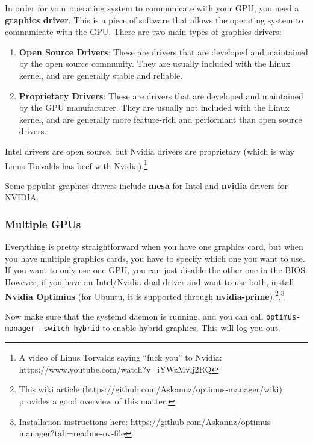   \begin{definition}
    \label{def:graphics-driver}
    In order for your operating system to communicate with your GPU, you need a \textbf{graphics driver}. This is a piece of software that allows the operating system to communicate with the GPU. There are two main types of graphics drivers:
    \begin{enumerate} 
      \item \textbf{Open Source Drivers}: These are drivers that are developed and maintained by the open source community. They are usually included with the Linux kernel, and are generally stable and reliable. 
      \item \textbf{Proprietary Drivers}: These are drivers that are developed and maintained by the GPU manufacturer. They are usually not included with the Linux kernel, and are generally more feature-rich and performant than open source drivers. 
    \end{enumerate}
  Intel drivers are open source, but Nvidia drivers are proprietary (which is why Linus Torvalds has beef with Nvidia).\footnote{A video of Linus Torvalds saying ``fuck you'' to Nvidia: https://www.youtube.com/watch?v=iYWzMvlj2RQ}
  \end{definition}

  Some popular \hyperref[def:graphics-driver]{graphics drivers} include \textbf{mesa} for Intel and \textbf{nvidia} drivers for NVIDIA. 

  \subsubsection{Multiple GPUs} 

    Everything is pretty straightforward when you have one graphics card, but when you have multiple graphics cards, you have to specify which one you want to use. If you want to only use one GPU, you can just disable the other one in the BIOS. However, if you have an Intel/Nvidia dual driver and want to use both, install \textbf{Nvidia Optimius} (for Ubuntu, it is supported through \textbf{nvidia-prime}).\footnote{This wiki article (https://github.com/Askannz/optimus-manager/wiki) provides a good overview of this matter. },\footnote{Installation instructions here: https://github.com/Askannz/optimus-manager?tab=readme-ov-file} 

    Now make sure that the systemd daemon is running, and you can call \texttt{optimus-manager --switch hybrid} to enable hybrid graphics. This will log you out. 

